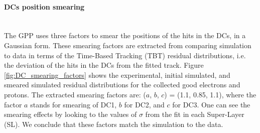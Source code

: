 \paragraph{DCs position smearing} ~\\
The GPP uses three factors to smear the positions of the hits in the DCs, in a Gaussian form. These smearing factors are extracted from comparing simulation to data in terms of the Time-Based Tracking (TBT) residual distributions, i.e. the deviation of the hits in the DCs from the fitted track. Figure \ref{fig:DC_smearing_factors} shows the experimental, initial simulated, and smeared simulated residual distributions for the collected good electrons and protons. The extracted smearing factors are: ($a$, $b$, $c$) = (1.1, 0.85, 1.1), where the factor $a$ stands for smearing of DC1, $b$ for DC2, and $c$ for DC3. One can see the smearing effects by looking to the values of $\sigma$ from the fit in each Super-Layer (SL). We conclude that these factors match the simulation to the data.
